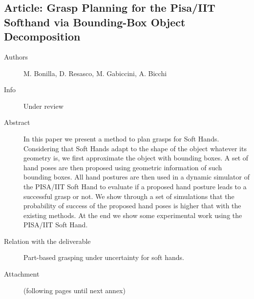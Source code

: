 \documentclass[a4paper,11pt,pdf]{pacmanreport}
\begin{document}
\subsection{Article: Grasp Planning for the Pisa/IIT Softhand via Bounding-Box Object Decomposition} \label{ann:boxedGrasp}
\begin{description}
    \item[Authors] M. Bonilla, D. Resasco, M. Gabiccini, A. Bicchi
    \item[Info] Under review
    \item[Abstract] In this paper we present a method to plan grasps for Soft Hands. Considering that Soft Hands adapt to the shape of the object whatever its geometry is, we first approximate the object with bounding boxes. A set of hand poses are then proposed using geometric information of such bounding boxes. All hand postures are then used in a dynamic simulator of the PISA/IIT Soft Hand to evaluate if a proposed hand posture leads to a successful grasp or not.
    We show through a set of simulations that the probability of success of the proposed hand poses is higher that with the existing methods.
    At the end we show some experimental work using the PISA/IIT Soft Hand.
    \item[Relation with the deliverable] Part-based grasping under uncertainty for soft hands.
    \item[Attachment] (following pages until next annex)
\end{description}
%
\end{document}
